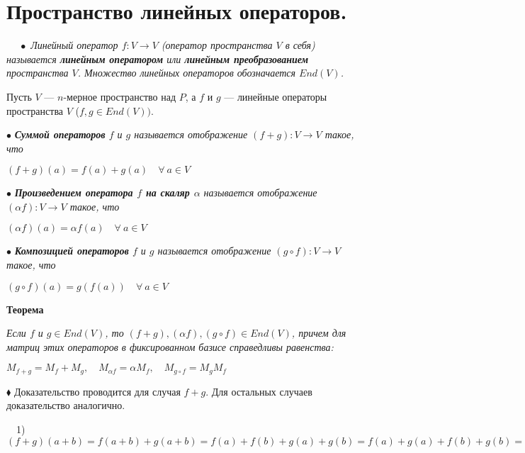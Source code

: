 \documentclass[a4paper, 12pt]{report}
\begin{document}
	
	
	
	
	
	
	
	
	
	
	
	
	\section{Пространство линейных операторов.}
	$\quad\; \bullet$ \textit{Линейный оператор $f:V\rightarrow V$ (оператор пространства $V$ в себя) называется \textbf{линейным оператором} или \textbf{линейным преобразованием} пространства $V$. Множество линейных операторов обозначается $End(V)$.}
	\par\bigskip
	Пусть $V$ --- $n$-мерное пространство над $P$, а $f$ и $g$ --- линейные операторы пространства $V$ ($f, g \in End(V))$.
	\par\bigskip
	$\bullet$\textit{\textbf{ Суммой операторов} $f$ и $g$ называется отображение $(f + g) : V\rightarrow V$ такое, что }
	\begin{center}
		$(f+g)(a) = f(a) + g(a)\quad \forall\ a \in V$
	\end{center}
	
	$\bullet$\textit{\textbf{ Произведением оператора $f$ на скаляр $\alpha$} называется отображение $(\alpha f) : V\rightarrow V$ такое, что }
	\begin{center}
		$(\alpha f)(a) = \alpha f(a)\quad \forall\ a \in V$
	\end{center}
	
	$\bullet$\textit{\textbf{ Композицией операторов} $f$ и $g$ называется отображение $(g \circ f) : V\rightarrow V$ такое, что }
	\begin{center}
		$(g \circ f)(a) =g(f(a))\quad \forall\ a \in V$
	\end{center}
	
	\textbf{Теорема}
	
	\textit{Если $f$ и $g\in End(V)$, то $(f+g), (\alpha f), (g\circ f) \in End(V)$, причем для матриц этих операторов в фиксированном базисе справедливы равенства:}
	
	\begin{center}
		$M_{f+g} = M_f + M_g,\quad M_{\alpha f} = \alpha M_f,\quad M_{g \circ f} = M_g M_f$
	\end{center}
	
	$\blacklozenge$ Доказательство проводится для случая $f+g$. Для остальных случаев доказательство аналогично.
	
	$\quad$1) $(f+g)(a+b) = f(a+b) + g(a+b) = f(a) + f(b) + g(a) + g(b) = f(a) + g(a) + f(b) + g(b) =$ 
	
\end{document}
